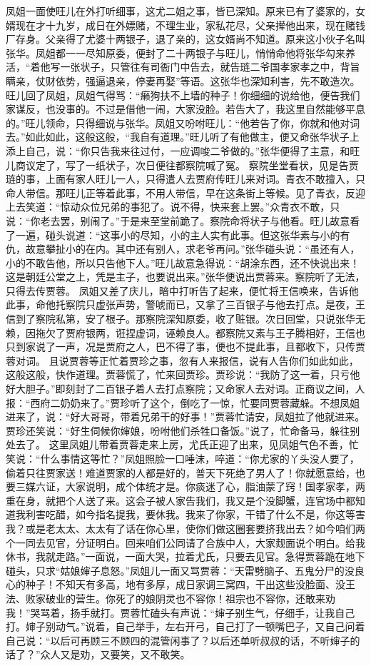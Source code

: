 \documentclass[12pt,oneside]{book}
\begin{document}
凤姐一面使旺儿在外打听细事，这尤二姐之事，皆已深知。原来已有了婆家的，女婿现在才十九岁，成日在外嫖赌，不理生业，家私花尽，父亲撵他出来，现在赌钱厂存身。父亲得了尤婆十两银子，退了亲的，这女婿尚不知道。原来这小伙子名叫张华。凤姐都一一尽知原委，便封了二十两银子与旺儿，悄悄命他将张华勾来养活，“着他写一张状子，只管往有司衙门中告去，就告琏二爷国孝家孝之中，背旨瞒亲，仗财依势，强逼退亲，停妻再娶”等语。这张华也深知利害，先不敢造次。旺儿回了凤姐，凤姐气得骂：“癞狗扶不上墙的种子！你细细的说给他，便告我们家谋反，也没事的。不过是借他一闹，大家没脸。若告大了，我这里自然能够平息的。”旺儿领命，只得细说与张华。凤姐又吩咐旺儿：“他若告了你，你就和他对词去。”如此如此，这般这般，“我自有道理。”旺儿听了有他做主，便又命张华状子上添上自己，说：“你只告我来往过付，一应调唆二爷做的。”张华便得了主意，和旺儿商议定了，写了一纸状子，次日便往都察院喊了冤。
察院坐堂看状，见是告贾琏的事，上面有家人旺儿一人，只得遣人去贾府传旺儿来对词。青衣不敢擅入，只命人带信。那旺儿正等着此事，不用人带信，早在这条街上等候。见了青衣，反迎上去笑道：“惊动众位兄弟的事犯了。说不得，快来套上罢。”众青衣不敢，只说：“你老去罢，别闹了。”于是来至堂前跪了。察院命将状子与他看。旺儿故意看了一遍，碰头说道：“这事小的尽知，小的主人实有此事。但这张华素与小的有仇，故意攀扯小的在内。其中还有别人，求老爷再问。”张华碰头说：“虽还有人，小的不敢告他，所以只告他下人。”旺儿故意急得说：“胡涂东西，还不快说出来！这是朝廷公堂之上，凭是主子，也要说出来。”张华便说出贾蓉来。察院听了无法，只得去传贾蓉。
凤姐又差了庆儿，暗中打听告了起来，便忙将王信唤来，告诉他此事，命他托察院只虚张声势，警唬而已，又拿了三百银子与他去打点。是夜，王信到了察院私第，安了根子。那察院深知原委，收了赃银。次日回堂，只说张华无赖，因拖欠了贾府银两，诳捏虚词，诬赖良人。都察院又素与王子腾相好，王信也只到家说了一声，况是贾府之人，巴不得了事，便也不提此事，且都收下，只传贾蓉对词。
且说贾蓉等正忙着贾珍之事，忽有人来报信，说有人告你们如此如此，这般这般，快作道理。贾蓉慌了，忙来回贾珍。贾珍说：“我防了这一着，只亏他好大胆子。”即刻封了二百银子着人去打点察院；又命家人去对词。正商议之间，人报：“西府二奶奶来了。”贾珍听了这个，倒吃了一惊，忙要同贾蓉藏躲。不想凤姐进来了，说：“好大哥哥，带着兄弟干的好事！”贾蓉忙请安，凤姐拉了他就进来。贾珍还笑说：“好生伺候你婶娘，吩咐他们杀牲口备饭。”说了，忙命备马，躲往别处去了。
这里凤姐儿带着贾蓉走来上房，尤氏正迎了出来，见凤姐气色不善，忙笑说：“什么事情这等忙？”凤姐照脸一口唾沫，啐道：“你尤家的丫头没人要了，偷着只往贾家送！难道贾家的人都是好的，普天下死绝了男人了！你就愿意给，也要三媒六证，大家说明，成个体统才是。你痰迷了心，脂油蒙了窍！国孝家孝，两重在身，就把个人送了来。这会子被人家告我们，我又是个没脚蟹，连官场中都知道我利害吃醋，如今指名提我，要休我。我来了你家，干错了什么不是，你这等害我？或是老太太、太太有了话在你心里，使你们做这圈套要挤我出去？如今咱们两个一同去见官，分证明白。回来咱们公同请了合族中人，大家觌面说个明白。给我休书，我就走路。”一面说，一面大哭，拉着尤氏，只要去见官。急得贾蓉跪在地下碰头，只求“姑娘婶子息怒。”凤姐儿一面又骂贾蓉：“天雷劈脑子、五鬼分尸的没良心的种子！不知天有多高，地有多厚，成日家调三窝四，干出这些没脸面、没王法、败家破业的营生。你死了的娘阴灵也不容你！祖宗也不容你，还敢来劝我！”哭骂着，扬手就打。贾蓉忙磕头有声说：“婶子别生气，仔细手，让我自己打。婶子别动气。”说着，自己举手，左右开弓，自己打了一顿嘴巴子，又自己问着自己说：“以后可再顾三不顾四的混管闲事了？以后还单听叔叔的话，不听婶子的话了？”众人又是劝，又要笑，又不敢笑。
\end{document}
